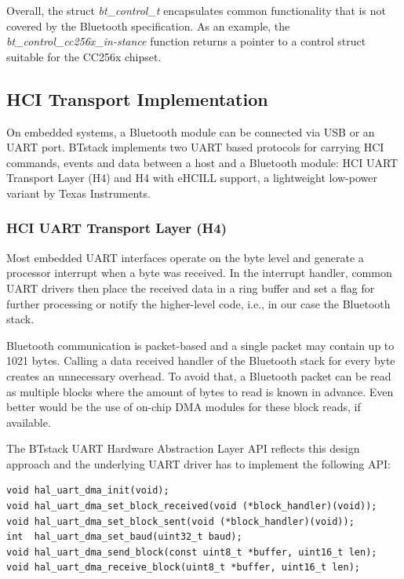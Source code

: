 \documentclass[a4paper,titlepage,oneside,12pt]{amsart} %
\begin{document}
Overall, the struct \emph{bt\_control\_t} encapsulates common functionality that is not covered by the Bluetooth specification. As an example, the \emph{bt\_control\_cc256x\_in-stance} function returns a pointer to a control struct suitable for the CC256x chipset.

 \subsection{HCI Transport Implementation}
 \label{section:hci_transport}
On embedded systems, a Bluetooth module can be connected via USB or an UART port. BTstack implements two UART based protocols for carrying HCI commands, events and data between a host and a Bluetooth module: HCI UART Transport Layer (H4) and H4 with eHCILL support, a lightweight low-power variant by Texas Instruments.

 \subsubsection{HCI UART Transport Layer (H4)}
 \label{section:hciUART}
Most embedded UART interfaces operate on the byte level and generate a processor interrupt when a byte was received. In the interrupt handler, common UART drivers then place the received data in a ring buffer and set a flag for further processing or notify the higher-level code, i.e., in our case the Bluetooth stack.

Bluetooth communication is packet-based and a single packet may contain up to 1021 bytes. Calling a data received handler of the Bluetooth stack for every byte creates an unnecessary overhead. To avoid that, a Bluetooth packet can be read as multiple blocks where the amount of bytes to read is known in advance. Even better would be the use of on-chip DMA modules for these block reads, if available.


The BTstack UART Hardware Abstraction Layer API reflects this design approach and the underlying UART driver has to implement the following API:

 \begin{lstlisting}
void hal_uart_dma_init(void);
void hal_uart_dma_set_block_received(void (*block_handler)(void));
void hal_uart_dma_set_block_sent(void (*block_handler)(void));
int  hal_uart_dma_set_baud(uint32_t baud);
void hal_uart_dma_send_block(const uint8_t *buffer, uint16_t len);
void hal_uart_dma_receive_block(uint8_t *buffer, uint16_t len);
 \end{lstlisting}
 
\end{document}
